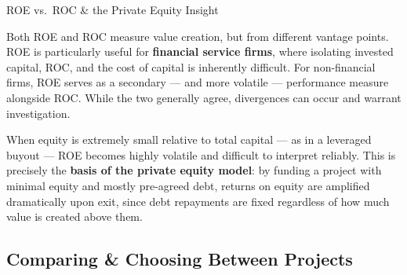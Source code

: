 \documentclass[10pt]{article}
\begin{document}
    \begin{core}{ROE vs.\ ROC \& the Private Equity Insight}

      Both ROE and ROC measure value creation, but from different vantage points. ROE is particularly useful for \textbf{financial service firms}, where isolating invested capital, ROC, and the cost of capital is inherently difficult. For non-financial firms, ROE serves as a secondary — and more volatile — performance measure alongside ROC. While the two generally agree, divergences can occur and warrant investigation.

      When equity is extremely small relative to total capital — as in a leveraged buyout — ROE becomes highly volatile and difficult to interpret reliably. This is precisely the \textbf{basis of the private equity model}: by funding a project with minimal equity and mostly pre-agreed debt, returns on equity are amplified dramatically upon exit, since debt repayments are fixed regardless of how much value is created above them.


    \end{core}

  \subsection{Comparing \& Choosing Between Projects}
\end{document}

